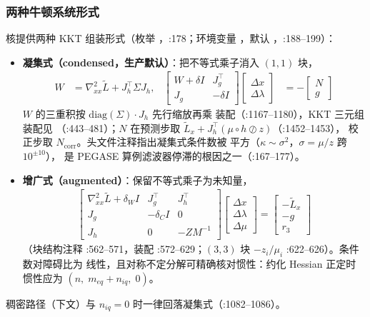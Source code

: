 \subsubsection*{两种牛顿系统形式}
核提供两种 KKT 组装形式（枚举 ，:178；环境变量
，默认 ，:188--199）：
\begin{itemize}
  \item \textbf{凝集式（condensed，生产默认）}：把不等式乘子消入
        $(1,1)$ 块，
        \begin{align*}
        W &= \nabla^{2}_{xx}\tilde L + J_h^{\top}\Sigma J_h,
        &
        \begin{bmatrix} W+\delta I & J_g^{\top}\\ J_g & -\delta I\end{bmatrix}
        \begin{bmatrix}\Delta x\\ \Delta\lambda\end{bmatrix}
        &= -\begin{bmatrix} N\\ g\end{bmatrix}
        \end{align*}
        $W$ 的三重积按 $\mathrm{diag}(\Sigma)\cdot J_h$ 先行缩放再乘
        装配（:1167--1180），KKT 三元组装配见
        （:443--481）；$N$ 在预测步取
        $\tilde L_x + J_h^{\top}(\mu\circ h\oslash z)$（:1452--1453），
        校正步取 $N_{\mathrm{corr}}$。头文件注释指出凝集式条件数被
        平方（$\kappa\sim\sigma^2$，$\sigma=\mu/z$ 跨 $10^{\pm10}$），
        是 PEGASE 算例滤波器停滞的根因之一（:167--177）。
  \item \textbf{增广式（augmented）}：保留不等式乘子为未知量，
        \begin{align*}
        \begin{bmatrix}
        \nabla^{2}_{xx}\tilde L+\delta_W I & J_g^{\top} & J_h^{\top}\\
        J_g & -\delta_C I & 0\\
        J_h & 0 & -ZM^{-1}
        \end{bmatrix}
        \begin{bmatrix}\Delta x\\ \Delta\lambda\\ \Delta\mu\end{bmatrix}
        = \begin{bmatrix}-\tilde L_x\\ -g\\ r_3\end{bmatrix}
        \end{align*}
        （块结构注释 :562--571，装配 
        :572--629；$(3,3)$ 块 $-z_i/\mu_i$ :622--626）。条件数对障碍比为
        线性，且对称不定分解可精确核对惯性：约化 Hessian 正定时惯性应为
        $(n,\;m_{eq}+n_{iq},\;0)$。
\end{itemize}
稠密路径（下文）与 $n_{iq}=0$ 时一律回落凝集式（:1082--1086）。

